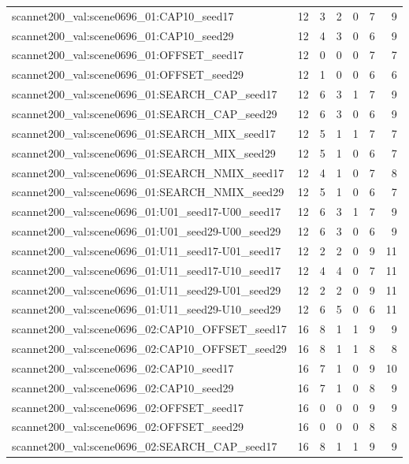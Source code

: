 \begin{table}[t]
\begin{tabular}{lrrrrrr}
scannet200\_val:scene0696\_01:CAP10\_seed17 & 12 & 3 & 2 & 0 & 7 & 9 \\
scannet200\_val:scene0696\_01:CAP10\_seed29 & 12 & 4 & 3 & 0 & 6 & 9 \\
scannet200\_val:scene0696\_01:OFFSET\_seed17 & 12 & 0 & 0 & 0 & 7 & 7 \\
scannet200\_val:scene0696\_01:OFFSET\_seed29 & 12 & 1 & 0 & 0 & 6 & 6 \\
scannet200\_val:scene0696\_01:SEARCH\_CAP\_seed17 & 12 & 6 & 3 & 1 & 7 & 9 \\
scannet200\_val:scene0696\_01:SEARCH\_CAP\_seed29 & 12 & 6 & 3 & 0 & 6 & 9 \\
scannet200\_val:scene0696\_01:SEARCH\_MIX\_seed17 & 12 & 5 & 1 & 1 & 7 & 7 \\
scannet200\_val:scene0696\_01:SEARCH\_MIX\_seed29 & 12 & 5 & 1 & 0 & 6 & 7 \\
scannet200\_val:scene0696\_01:SEARCH\_NMIX\_seed17 & 12 & 4 & 1 & 0 & 7 & 8 \\
scannet200\_val:scene0696\_01:SEARCH\_NMIX\_seed29 & 12 & 5 & 1 & 0 & 6 & 7 \\
scannet200\_val:scene0696\_01:U01\_seed17-U00\_seed17 & 12 & 6 & 3 & 1 & 7 & 9 \\
scannet200\_val:scene0696\_01:U01\_seed29-U00\_seed29 & 12 & 6 & 3 & 0 & 6 & 9 \\
scannet200\_val:scene0696\_01:U11\_seed17-U01\_seed17 & 12 & 2 & 2 & 0 & 9 & 11 \\
scannet200\_val:scene0696\_01:U11\_seed17-U10\_seed17 & 12 & 4 & 4 & 0 & 7 & 11 \\
scannet200\_val:scene0696\_01:U11\_seed29-U01\_seed29 & 12 & 2 & 2 & 0 & 9 & 11 \\
scannet200\_val:scene0696\_01:U11\_seed29-U10\_seed29 & 12 & 6 & 5 & 0 & 6 & 11 \\
scannet200\_val:scene0696\_02:CAP10\_OFFSET\_seed17 & 16 & 8 & 1 & 1 & 9 & 9 \\
scannet200\_val:scene0696\_02:CAP10\_OFFSET\_seed29 & 16 & 8 & 1 & 1 & 8 & 8 \\
scannet200\_val:scene0696\_02:CAP10\_seed17 & 16 & 7 & 1 & 0 & 9 & 10 \\
scannet200\_val:scene0696\_02:CAP10\_seed29 & 16 & 7 & 1 & 0 & 8 & 9 \\
scannet200\_val:scene0696\_02:OFFSET\_seed17 & 16 & 0 & 0 & 0 & 9 & 9 \\
scannet200\_val:scene0696\_02:OFFSET\_seed29 & 16 & 0 & 0 & 0 & 8 & 8 \\
scannet200\_val:scene0696\_02:SEARCH\_CAP\_seed17 & 16 & 8 & 1 & 1 & 9 & 9 \\

\end{tabular}
\end{table}
